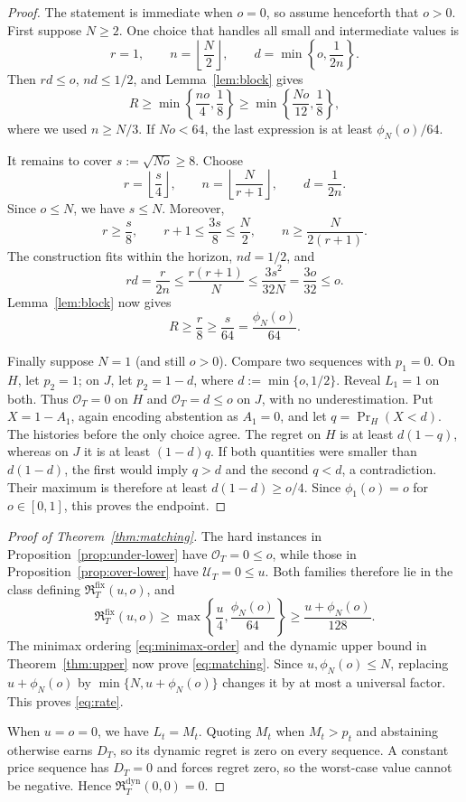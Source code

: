 \documentclass[11pt]{article}
\theoremstyle{remark}
\newcommand{\cU}{\mathcal U}
\newcommand{\cO}{\mathcal O}
\newcommand{\Rstar}{\mathfrak R}
\begin{document}
\begin{proof}
The statement is immediate when $o=0$, so assume henceforth that $o>0$.
First suppose $N\ge2$.  One choice
that handles all small and intermediate values is
\[
  r=1,
  \qquad
  n=\left\lfloor\frac N2\right\rfloor,
  \qquad
  d=\min\left\{o,\frac1{2n}\right\}.
\]
Then $rd\le o$, $nd\le1/2$, and Lemma~\ref{lem:block} gives
\begin{equation}\label{eq:small-o-lower}
  R\ge\min\left\{\frac{no}{4},\frac18\right\}
   \ge\min\left\{\frac{No}{12},\frac18\right\},
\end{equation}
where we used $n\ge N/3$.  If $No<64$, the last expression is at least
$\phi_N(o)/64$.

It remains to cover $s:=\sqrt{No}\ge8$.  Choose
\[
  r=\left\lfloor\frac s4\right\rfloor,
  \qquad
  n=\left\lfloor\frac{N}{r+1}\right\rfloor,
  \qquad
  d=\frac1{2n}.
\]
Since $o\le N$, we have $s\le N$.  Moreover,
\[
  r\ge\frac s8,
  \qquad
  r+1\le\frac{3s}{8}\le\frac N2,
  \qquad
  n\ge\frac{N}{2(r+1)}.
\]
The construction fits within the horizon, $nd=1/2$, and
\[
  rd=\frac r{2n}
  \le\frac{r(r+1)}{N}
  \le\frac{3s^2}{32N}
  =\frac{3o}{32}
  \le o.
\]
Lemma~\ref{lem:block} now gives
\[
  R\ge\frac r8\ge\frac s{64}
   =\frac{\phi_N(o)}{64}.
\]

Finally suppose $N=1$ (and still $o>0$).  Compare two sequences with $p_1=0$.  On $H$, let
$p_2=1$; on $J$, let $p_2=1-d$, where $d:=\min\{o,1/2\}$.  Reveal
$L_1=1$ on both.  Thus $\cO_T=0$ on $H$ and $\cO_T=d\le o$ on $J$, with no
underestimation.  Put $X=1-A_1$, again encoding abstention as $A_1=0$, and
let $q=\Pr_H(X<d)$.  The histories before the only choice agree.  The regret
on $H$ is at least $d(1-q)$, whereas on $J$ it is at least $(1-d)q$.
If both quantities were smaller than $d(1-d)$, the first would imply $q>d$
and the second $q<d$, a contradiction.  Their maximum is therefore at least
$d(1-d)\ge o/4$.  Since
$\phi_1(o)=o$ for $o\in[0,1]$, this proves the endpoint.
\end{proof}

\begin{proof}[Proof of Theorem~\ref{thm:matching}]
The hard instances in Proposition~\ref{prop:under-lower} have
$\cO_T=0\le o$, while those in Proposition~\ref{prop:over-lower} have
$\cU_T=0\le u$.  Both families therefore lie in the class defining
$\Rstar_T^{\mathrm{fix}}(u,o)$, and
\[
  \Rstar_T^{\mathrm{fix}}(u,o)
  \ge\max\left\{\frac u4,\frac{\phi_N(o)}{64}\right\}
  \ge\frac{u+\phi_N(o)}{128}.
\]
The minimax ordering \eqref{eq:minimax-order} and the dynamic upper bound in
Theorem~\ref{thm:upper} now prove \eqref{eq:matching}.  Since
$u,\phi_N(o)\le N$, replacing
$u+\phi_N(o)$ by $\min\{N,u+\phi_N(o)\}$ changes it by at most a universal
factor.  This proves \eqref{eq:rate}.

When $u=o=0$, we have $L_t=M_t$.  Quoting $M_t$ when $M_t>p_t$ and
abstaining otherwise earns $D_T$, so its dynamic regret is zero on every
sequence.  A constant price sequence has $D_T=0$ and forces regret zero, so
the worst-case value cannot be negative.  Hence
$\Rstar_T^{\mathrm{dyn}}(0,0)=0$.
\end{proof}
\end{document}
